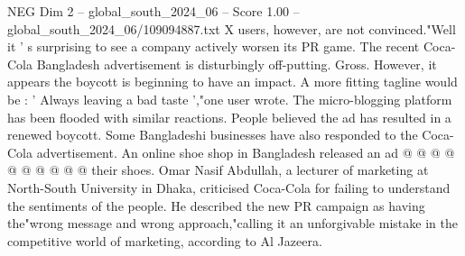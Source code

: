 \begin{textsample}{NEG Dim 2 – global\_south\_2024\_06 – Score 1.00 – global\_south\_2024\_06/109094887.txt}
X users, however, are not convinced."Well it ' s surprising to see a company actively worsen its PR game.
The recent Coca-Cola Bangladesh advertisement is disturbingly off-putting.
Gross.
However, it appears the boycott is beginning to have an impact.
A more fitting tagline would be : ' Always leaving a bad taste ',"one user wrote.
The micro-blogging platform has been flooded with similar reactions.
People believed the ad has resulted in a renewed boycott.
Some Bangladeshi businesses have also responded to the Coca-Cola advertisement.
An online shoe shop in Bangladesh released an ad @ @ @ @ @ @ @ @ @ @ their shoes.
Omar Nasif Abdullah, a lecturer of marketing at North-South University in Dhaka, criticised Coca-Cola for failing to understand the sentiments of the people.
He described the new PR campaign as having the"wrong message and wrong approach,"calling it an unforgivable mistake in the competitive world of marketing, according to Al Jazeera.

\end{textsample}
